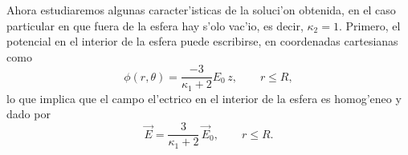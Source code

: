  Ahora estudiaremos algunas caracter'isticas de la soluci'on obtenida, en el caso particular en que fuera de la esfera hay s'olo vac'io, es decir, $\kappa_2=1$. Primero, el potencial en el interior de la esfera puede escribirse, en coordenadas cartesianas como
 \begin{equation}
\phi(r,\theta)=\frac{-3}{\kappa_1+2}E_0\,z, \qquad r\le R,
\end{equation}
lo que implica que el campo el'ectrico en el interior de la esfera es homog'eneo y dado por
\begin{equation}
\vec{E}=\frac{3}{\kappa_1+2}\,\vec{E}_0, \qquad r\le R.
\end{equation}

